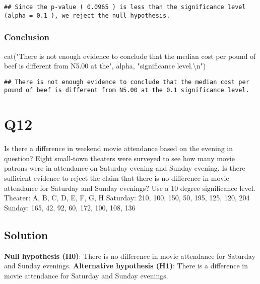 \documentclass[
]{article}
\newenvironment{Shaded}{\begin{snugshade}}{\end{snugshade}}
\newcommand{\FunctionTok}[1]{\textcolor[rgb]{0.00,0.00,0.00}{#1}}
\newcommand{\NormalTok}[1]{#1}
\newcommand{\SpecialCharTok}[1]{\textcolor[rgb]{0.00,0.00,0.00}{#1}}
\newcommand{\StringTok}[1]{\textcolor[rgb]{0.31,0.60,0.02}{#1}}
\begin{document}
\begin{verbatim}
## Since the p-value ( 0.0965 ) is less than the significance level (alpha = 0.1 ), we reject the null hypothesis.
\end{verbatim}

\hypertarget{conclusion}{%
\subsubsection{Conclusion}\label{conclusion}}

\begin{Shaded}
\begin{Highlighting}[]
\FunctionTok{cat}\NormalTok{(}\StringTok{"There is not enough evidence to conclude that the median cost per pound of beef is different from N5.00 at the"}\NormalTok{, alpha, }\StringTok{"significance level.}\SpecialCharTok{\textbackslash{}n}\StringTok{"}\NormalTok{)}
\end{Highlighting}
\end{Shaded}

\begin{verbatim}
## There is not enough evidence to conclude that the median cost per pound of beef is different from N5.00 at the 0.1 significance level.
\end{verbatim}

\hypertarget{q12}{%
\section{Q12}\label{q12}}

Is there a difference in weekend movie attendance based on the evening
in question? Eight small-town theaters were surveyed to see how many
movie patrons were in attendance on Saturday evening and Sunday evening.
Is there sufficient evidence to reject the claim that there is no
difference in movie attendance for Saturday and Sunday evenings? Use a
10 degree significance level. Theater: A, B, C, D, E, F, G, H Saturday:
210, 100, 150, 50, 195, 125, 120, 204 Sunday: 165, 42, 92, 60, 172, 100,
108, 136

\hypertarget{solution-12}{%
\subsection{Solution}\label{solution-12}}

\textbf{Null hypothesis (H0)}: There is no difference in movie
attendance for Saturday and Sunday evenings. \textbf{Alternative
hypothesis (H1)}: There is a difference in movie attendance for Saturday
and Sunday evenings.
\end{document}
